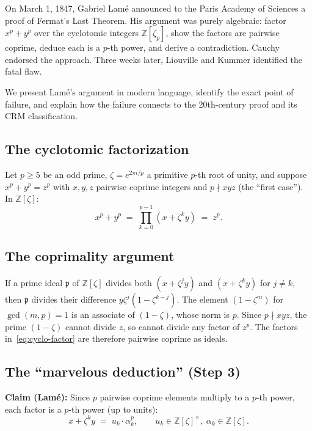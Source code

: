 \documentclass[11pt,a4paper]{article}
\theoremstyle{plain}
\theoremstyle{definition}
\newcommand{\Z}{\mathbb{Z}}
\begin{document}
On March 1, 1847, Gabriel Lam\'e announced to the Paris Academy of Sciences a proof of Fermat's Last Theorem.
His argument was purely algebraic: factor $x^p + y^p$ over the cyclotomic integers $\Z[\zeta_p]$, show the factors are pairwise coprime, deduce each is a $p$-th power, and derive a contradiction.
Cauchy endorsed the approach.
Three weeks later, Liouville and Kummer identified the fatal flaw.

We present Lam\'e's argument in modern language, identify the exact point of failure, and explain how the failure connects to the 20th-century proof and its CRM classification.

\subsection*{The cyclotomic factorization}

Let $p \geq 5$ be an odd prime, $\zeta = e^{2\pi i/p}$ a primitive $p$-th root of unity, and suppose $x^p + y^p = z^p$ with $x, y, z$ pairwise coprime integers and $p \nmid xyz$ (the ``first case'').
In $\Z[\zeta]$:
\begin{equation}\label{eq:cyclo-factor}
x^p + y^p \;=\; \prod_{k=0}^{p-1} (x + \zeta^k y) \;=\; z^p.
\end{equation}

\subsection*{The coprimality argument}

If a prime ideal $\mathfrak{p}$ of $\Z[\zeta]$ divides both $(x + \zeta^j y)$ and $(x + \zeta^k y)$ for $j \neq k$, then $\mathfrak{p}$ divides their difference $y \zeta^j (1 - \zeta^{k-j})$.
The element $(1 - \zeta^m)$ for $\gcd(m,p) = 1$ is an associate of $(1 - \zeta)$, whose norm is $p$.
Since $p \nmid xyz$, the prime $(1-\zeta)$ cannot divide $z$, so cannot divide any factor of $z^p$.
The factors in~\eqref{eq:cyclo-factor} are therefore pairwise coprime as ideals.

\subsection*{The ``marvelous deduction'' (Step 3)}

\textbf{Claim (Lam\'e):} Since $p$ pairwise coprime elements multiply to a $p$-th power, each factor is a $p$-th power (up to units):
\begin{equation}\label{eq:lame-step3}
x + \zeta^k y \;=\; u_k \cdot \alpha_k^p, \qquad u_k \in \Z[\zeta]^\times,\; \alpha_k \in \Z[\zeta].
\end{equation}
\end{document}

